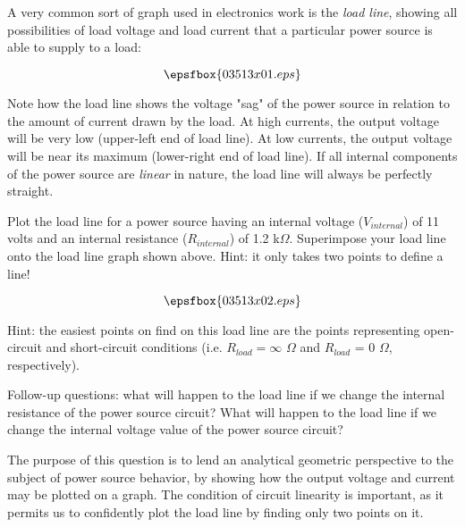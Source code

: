

A very common sort of graph used in electronics work is the {\it load line}, showing all possibilities of load voltage and load current that a particular power source is able to supply to a load:

$$\epsfbox{03513x01.eps}$$

Note how the load line shows the voltage "sag" of the power source in relation to the amount of current drawn by the load.  At high currents, the output voltage will be very low (upper-left end of load line).  At low currents, the output voltage will be near its maximum (lower-right end of load line).  If all internal components of the power source are {\it linear} in nature, the load line will always be perfectly straight.

Plot the load line for a power source having an internal voltage ($V_{internal}$) of 11 volts and an internal resistance ($R_{internal}$) of 1.2 k$\Omega$.  Superimpose your load line onto the load line graph shown above.  Hint: it only takes two points to define a line!







$$\epsfbox{03513x02.eps}$$

\vskip 10pt

Hint: the easiest points on find on this load line are the points representing open-circuit and short-circuit conditions (i.e. $R_{load} = \infty$ $\Omega$ and $R_{load}$ = 0 $\Omega$, respectively).

\vskip 10pt

Follow-up questions: what will happen to the load line if we change the internal resistance of the power source circuit?  What will happen to the load line if we change the internal voltage value of the power source circuit?







The purpose of this question is to lend an analytical geometric perspective to the subject of power source behavior, by showing how the output voltage and current may be plotted on a graph.  The condition of circuit linearity is important, as it permits us to confidently plot the load line by finding only two points on it.




